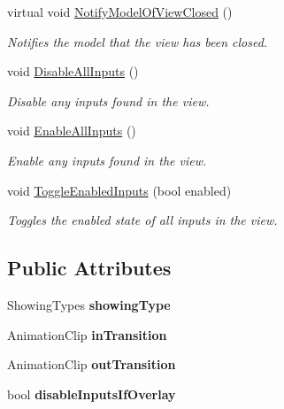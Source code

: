 \begin{DoxyCompactItemize}
virtual void \hyperlink{class_scaffolding_1_1_abstract_view_a9dbb324d1671f845976f1fa23d01ccde}{Notify\+Model\+Of\+View\+Closed} ()
\begin{DoxyCompactList}\small\item\em Notifies the model that the view has been closed. \end{DoxyCompactList}\item 
void \hyperlink{class_scaffolding_1_1_abstract_view_a1bb34cd891cb97082030215fdb8b8794}{Disable\+All\+Inputs} ()
\begin{DoxyCompactList}\small\item\em Disable any inputs found in the view. \end{DoxyCompactList}\item 
void \hyperlink{class_scaffolding_1_1_abstract_view_ae550b6838501b3c2e3751535059c478e}{Enable\+All\+Inputs} ()
\begin{DoxyCompactList}\small\item\em Enable any inputs found in the view. \end{DoxyCompactList}\item 
void \hyperlink{class_scaffolding_1_1_abstract_view_a5e6cdf214eaa49da7ef180c6874353b0}{Toggle\+Enabled\+Inputs} (bool enabled)
\begin{DoxyCompactList}\small\item\em Toggles the enabled state of all inputs in the view. \end{DoxyCompactList}\end{DoxyCompactItemize}
\subsection*{Public Attributes}
\begin{DoxyCompactItemize}
\item 
\hypertarget{class_scaffolding_1_1_abstract_view_a7a3bdf62bce105b7857671d30adb179b}{Showing\+Types {\bfseries showing\+Type}}\label{class_scaffolding_1_1_abstract_view_a7a3bdf62bce105b7857671d30adb179b}

\item 
\hypertarget{class_scaffolding_1_1_abstract_view_addde808d8caa8a49014303bf1dcc1f8e}{Animation\+Clip {\bfseries in\+Transition}}\label{class_scaffolding_1_1_abstract_view_addde808d8caa8a49014303bf1dcc1f8e}

\item 
\hypertarget{class_scaffolding_1_1_abstract_view_aa62967668127d7526d2bca78e1e1501b}{Animation\+Clip {\bfseries out\+Transition}}\label{class_scaffolding_1_1_abstract_view_aa62967668127d7526d2bca78e1e1501b}

\item 
\hypertarget{class_scaffolding_1_1_abstract_view_ae03980c52528bdb18b92932bb1f17e7b}{bool {\bfseries disable\+Inputs\+If\+Overlay}}\label{class_scaffolding_1_1_abstract_view_ae03980c52528bdb18b92932bb1f17e7b}

\end{DoxyCompactItemize}
